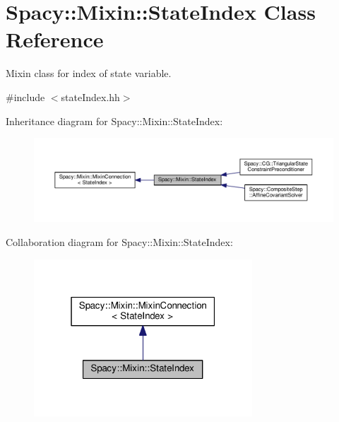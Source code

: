 \hypertarget{classSpacy_1_1Mixin_1_1StateIndex}{}\section{Spacy\+:\+:Mixin\+:\+:State\+Index Class Reference}
\label{classSpacy_1_1Mixin_1_1StateIndex}


Mixin class for index of state variable.  




{\ttfamily \#include $<$state\+Index.\+hh$>$}



Inheritance diagram for Spacy\+:\+:Mixin\+:\+:State\+Index\+:\nopagebreak
\begin{figure}[H]
\begin{center}
\leavevmode
\includegraphics[width=350pt]{classSpacy_1_1Mixin_1_1StateIndex__inherit__graph}
\end{center}
\end{figure}


Collaboration diagram for Spacy\+:\+:Mixin\+:\+:State\+Index\+:\nopagebreak
\begin{figure}[H]
\begin{center}
\leavevmode
\includegraphics[width=232pt]{classSpacy_1_1Mixin_1_1StateIndex__coll__graph}
\end{center}
\end{figure}
